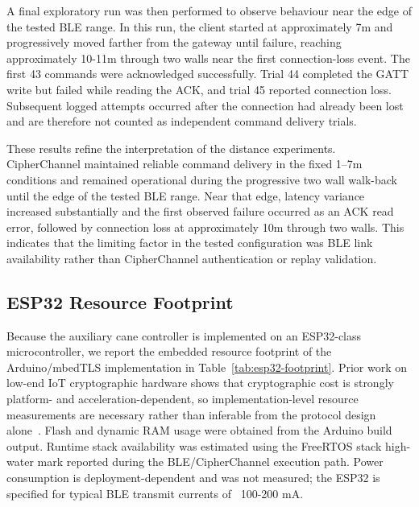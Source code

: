 \documentclass[journal]{IEEEtran}
\begin{document}
A final exploratory run was then performed to observe behaviour near the edge of the tested BLE range. In this run, the client started at approximately 7m and progressively moved farther from the gateway until failure, reaching approximately 10-11m through two walls near the first connection-loss event. The first 43 commands were acknowledged successfully. Trial 44 completed the GATT write but failed while reading the ACK, and trial 45 reported connection loss. Subsequent logged attempts occurred after the connection had already been lost and are therefore not counted as independent command delivery trials.

These results refine the interpretation of the distance experiments. CipherChannel maintained reliable command delivery in the fixed 1--7m conditions and remained operational during the progressive two wall walk-back until the edge of the tested BLE range. Near that edge, latency variance increased substantially and the first observed failure occurred as an ACK read error, followed by connection loss at approximately 10m through two walls. This indicates that the limiting factor in the tested configuration was BLE link availability rather than CipherChannel authentication or replay validation.

\subsection{ESP32 Resource Footprint}
\label{sec:esp32-footprint}

Because the auxiliary cane controller is implemented on an ESP32-class microcontroller, we report the embedded resource footprint of the Arduino/mbedTLS implementation in Table~\ref{tab:esp32-footprint}. Prior work on low-end IoT cryptographic hardware shows that cryptographic cost is strongly platform- and acceleration-dependent, so implementation-level resource measurements are necessary rather than inferable from the protocol design alone~\cite{kietzmann2021hw}. Flash and dynamic RAM usage were obtained from the Arduino build output. Runtime stack availability was estimated using the FreeRTOS stack high-water mark reported during the BLE/CipherChannel execution path. Power consumption is deployment-dependent and was not measured; the ESP32 is specified for typical BLE transmit currents of ~100-200 mA.
\end{document}
